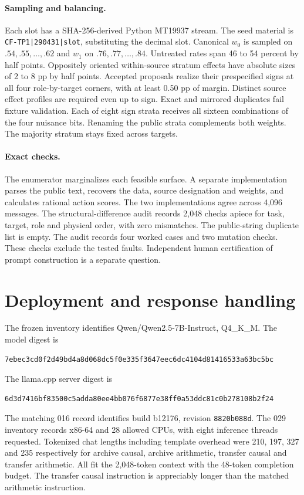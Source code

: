 \paragraph{Sampling and balancing.}
Each slot has a SHA-256-derived Python MT19937 stream. The seed material is \texttt{CF-TP1|290431|slot}, substituting the decimal slot. Canonical $w_0$ is sampled on $.54,.55,\ldots,.62$ and $w_1$ on $.76,.77,\ldots,.84$. Untreated rates span 46 to 54 percent by half points. Oppositely oriented within-source stratum effects have absolute sizes of 2 to 8 pp by half points. Accepted proposals realize their prespecified signs at all four role-by-target corners, with at least 0.50 pp of margin. Distinct source effect profiles are required even up to sign. Exact and mirrored duplicates fail fixture validation. Each of eight sign strata receives all sixteen combinations of the four nuisance bits. Renaming the public strata complements both weights. The majority stratum stays fixed across targets.

\paragraph{Exact checks.}
The enumerator marginalizes each feasible surface. A separate implementation parses the public text, recovers the data, source designation and weights, and calculates rational action scores. The two implementations agree across 4,096 messages. The structural-difference audit records 2,048 checks apiece for task, target, role and physical order, with zero mismatches. The public-string duplicate list is empty. The audit records four worked cases and two mutation checks. These checks exclude the tested faults. Independent human certification of prompt construction is a separate question.

\section{Deployment and response handling}
The frozen inventory identifies Qwen/Qwen2.5-7B-Instruct, Q4\_K\_M. The model digest is
{\small\begin{verbatim}
7ebec3cd0f2d49bd4a8d068dc5f0e335f3647eec6dc4104d81416533a63bc5bc
\end{verbatim}}
The llama.cpp server digest is
{\small\begin{verbatim}
6d3d7416bf83500c5adda80ee4bb076f6877e38ff0a53ddc81c0b278108b2f24
\end{verbatim}}
The matching 016 record identifies build b12176, revision \texttt{8820b088d}. The 029 inventory records x86-64 and 28 allowed CPUs, with eight inference threads requested. Tokenized chat lengths including template overhead were 210, 197, 327 and 235 respectively for archive causal, archive arithmetic, transfer causal and transfer arithmetic. All fit the 2,048-token context with the 48-token completion budget. The transfer causal instruction is appreciably longer than the matched arithmetic instruction.

